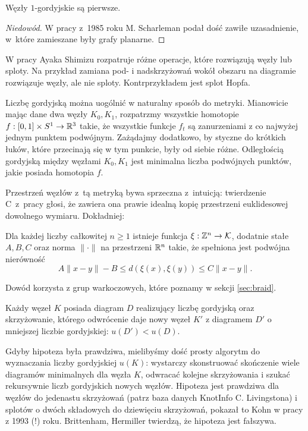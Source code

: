 \begin{proposition}
    Węzły $1$-gordyjskie są pierwsze.
\end{proposition}

\begin{proof}[Niedowód]
    W pracy \cite{scharleman85} z~1985 roku M. Scharleman podał dość zawiłe uzasadnienie, w~które zamieszane były grafy planarne.
\end{proof}

W pracy \cite{shimizu14} Ayaka Shimizu rozpatruje różne operacje, które rozwiązują węzły lub sploty.
Na przykład zamiana pod- i nadskrzyżowań wokół obszaru na diagramie rozwiązuje węzły, ale nie sploty.
Kontrprzykładem jest splot Hopfa.

Liczbę gordyjską można uogólnić w naturalny sposób do metryki.
Mianowicie mając dane dwa węzły $K_0, K_1$, rozpatrzmy wszystkie homotopie $f : [0,1] \times S^1 \to \mathbb R^3$ takie, że wszystkie funkcje $f_t$ są zanurzeniami z co najwyżej jednym punktem podwójnym.
Zażądajmy dodatkowo, by styczne do krótkich łuków, które przecinają się w tym punkcie, były od siebie różne.
Odległością gordyjską między węzłami $K_0, K_1$ jest minimalna liczba podwójnych punktów, jakie posiada homotopia $f$.

Przestrzeń węzłów z~tą metryką bywa sprzeczna z~intuicją: twierdzenie C~z~pracy \cite{gambaudo05} głosi, że zawiera ona prawie idealną kopię przestrzeni euklidesowej dowolnego wymiaru.
Dokładniej:

\begin{proposition}
    Dla każdej liczby całkowitej $n \ge 1$ istnieje funkcja $\xi: \mathbb Z^n \to \mathcal{K}$, dodatnie stałe $A, B, C$ oraz norma $\|\cdot\|$ na przestrzeni $\mathbb R^n$ takie, że spełniona jest podwójna nierówność
    \[
        A\|x-y\|  - B \le d(\xi(x), \xi(y)) \le C\|x-y\|.
    \]
\end{proposition}

Dowód korzysta z grup warkoczowych, które poznamy w sekcji \ref{sec:braid}.

\begin{conjecture} \label{bernhard_jablan}
    Każdy węzeł $K$ posiada diagram $D$ realizujący liczbę gordyjską oraz skrzyżowanie, którego odwrócenie daje nowy węzeł $K'$ z diagramem $D'$ o mniejszej liczbie gordyjskiej: $u(D') < u(D)$.
\end{conjecture}

Gdyby hipoteza była prawdziwa, mielibyśmy dość prosty algorytm do wyznaczania liczby gordyjskiej $u(K)$: wystarczy skonstruować skończenie wiele diagramów minimalnych dla węzła $K$, odwracać kolejne skrzyżowania i szukać rekursywnie liczb gordyjskich nowych węzłów.
Hipoteza jest prawdziwa dla węzłów do jedenastu skrzyżowań (patrz baza danych KnotInfo C. Livingstona) i splotów o dwóch składowych do dziewięciu skrzyżowań, pokazał to Kohn w pracy \cite{kohn93} z 1993 (!) roku.
Brittenham, Hermiller twierdzą, że hipoteza jest fałszywa.

